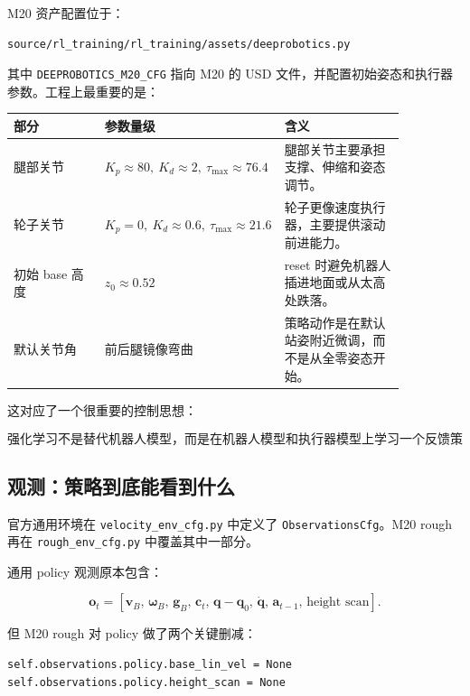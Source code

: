 \documentclass[UTF8,11pt,a4paper]{ctexart}
\newcommand{\bs}[1]{\bm{#1}}
\begin{document}
M20 资产配置位于：

\begin{verbatim}
source/rl_training/rl_training/assets/deeprobotics.py
\end{verbatim}

其中 \texttt{DEEPROBOTICS\_M20\_CFG} 指向 M20 的 USD 文件，并配置初始姿态和执行器参数。工程上最重要的是：

\begin{center}
\renewcommand{\arraystretch}{1.25}
\begin{tabular}{p{0.26\linewidth}p{0.25\linewidth}p{0.35\linewidth}}
\toprule
\textbf{部分} & \textbf{参数量级} & \textbf{含义}\\
\midrule
腿部关节 &
\(K_p\approx 80,\ K_d\approx 2,\ \tau_{\max}\approx 76.4\) &
腿部关节主要承担支撑、伸缩和姿态调节。\\
轮子关节 &
\(K_p=0,\ K_d\approx 0.6,\ \tau_{\max}\approx 21.6\) &
轮子更像速度执行器，主要提供滚动前进能力。\\
初始 base 高度 &
\(z_0\approx 0.52\) &
reset 时避免机器人插进地面或从太高处跌落。\\
默认关节角 &
前后腿镜像弯曲 &
策略动作是在默认站姿附近微调，而不是从全零姿态开始。\\
\bottomrule
\end{tabular}
\end{center}

这对应了一个很重要的控制思想：

\[
\boxed{
\text{强化学习不是替代机器人模型，而是在机器人模型和执行器模型上学习一个反馈策略。}
}
\]

\subsection{观测：策略到底能看到什么}

官方通用环境在 \texttt{velocity\_env\_cfg.py} 中定义了 \texttt{ObservationsCfg}。M20 rough 再在
\texttt{rough\_env\_cfg.py} 中覆盖其中一部分。

通用 policy 观测原本包含：

\[
\bs o_t=
\left[
\bs v_B,\,
\bs\omega_B,\,
\bs g_B,\,
\bs c_t,\,
\bs q-\bs q_0,\,
\dot{\bs q},\,
\bs a_{t-1},\,
\text{height scan}
\right].
\]

但 M20 rough 对 policy 做了两个关键删减：

\begin{verbatim}
self.observations.policy.base_lin_vel = None
self.observations.policy.height_scan = None
\end{verbatim}
\end{document}
